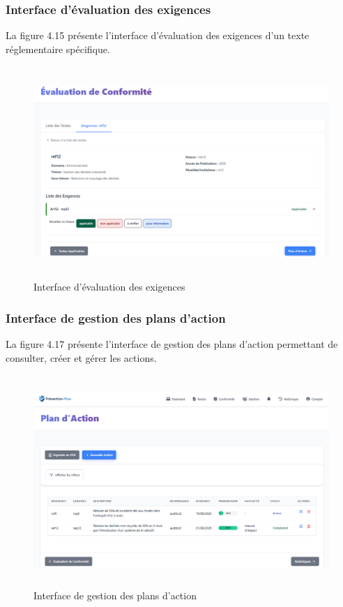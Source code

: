 \subsubsection{Interface d'évaluation des exigences}
\noindent La figure 4.15 présente l'interface d'évaluation des exigences d'un texte réglementaire spécifique.

\begin{figure}[H]
    \centering
    \includegraphics[width=13cm,height=8cm]{images/requirementevaluation.PNG}
    \caption{Interface d'évaluation des exigences}
\end{figure}

\subsubsection{Interface de gestion des plans d'action}
\noindent La figure 4.17 présente l'interface de gestion des plans d'action permettant de consulter, créer et gérer les actions.

\begin{figure}[H]
    \centering
    \includegraphics[width=13cm,height=8cm]{images/actionplansinterface.PNG}
    \caption{Interface de gestion des plans d'action}
\end{figure}

